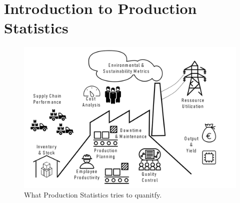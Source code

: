 \documentclass[
  a4paper,
]{scrbook}
\begin{document}
\section{Introduction to Production
Statistics}\label{introduction-to-production-statistics}

\begin{figure}[ht]

{\centering \includegraphics[width=0.75\linewidth,height=\textheight,keepaspectratio]{chapter004/001_ProductionStatistics.png}

}

\caption{What Production Statistics tries to quanitfy.}

\end{figure}%
\end{document}
